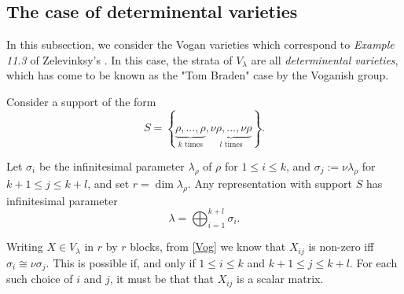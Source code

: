 \documentclass{memoir}
\newcommand{\lset}{\left\lbrace}
\newcommand{\rset}{\right\rbrace}
\newcommand{\tx}{\text}
\theoremstyle{definition}
\begin{document}
	
	
	
	
	\subsection{The case of determinental varieties}
	
	In this subsection, we consider the Vogan varieties which correspond to \emph{Example 11.3} of Zelevinksy's \cite{ZelI2}.  
	In this case, the strata of $V_\lambda$ are all \emph{determinental varieties}, which has come to be known as the "Tom Braden" case by the Voganish group. 
	
	Consider a support of the form
	$$S=\lset\underbrace{\rho, ..., \rho}_{k \tx{ times}}, \underbrace{\nu\rho, ..., \nu\rho}_{l \tx{ times}}\rset.$$
	
	Let $\sigma_i$ be the infinitesimal parameter $\lambda_\rho$ of $\rho$ for $1\leq i \leq k$, and $\sigma_j:=\nu\lambda_\rho$ for $k+1\leq j\leq k+l$, and set $r=\dim \lambda_\rho$.  
	Any representation with support $S$ has infinitesimal parameter
	$$\lambda=\bigoplus_{i=1}^{k+l}\sigma_i.$$
	
	Writing $X\in V_\lambda$ in $r$ by $r$ blocks, from \ref{Vog} we know that $X_{ij}$ is non-zero iff $\sigma_i\cong\nu\sigma_j$. 
	This is possible if, and only if $1\leq i \leq k$ and $k+1\leq j\leq k+l$.
	For each such choice of $i$ and $j$, it must be that that $X_{ij}$ is a scalar matrix.  
	
\end{document}

